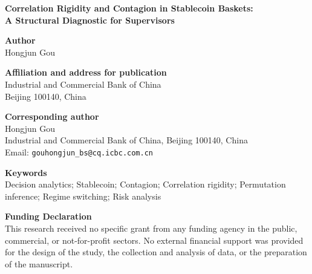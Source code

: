 \documentclass[11pt]{article}
\begin{document}
\begin{center}
{\Large\bfseries Correlation Rigidity and Contagion in Stablecoin Baskets:\\[2pt]
A Structural Diagnostic for Supervisors}
\end{center}

\bigskip
\noindent\textbf{Author}\\
Hongjun Gou

\bigskip
\noindent\textbf{Affiliation and address for publication}\\
Industrial and Commercial Bank of China\\
Beijing 100140, China

\bigskip
\noindent\textbf{Corresponding author}\\
Hongjun Gou\\
Industrial and Commercial Bank of China, Beijing 100140, China\\
Email: \texttt{gouhongjun\_bs@cq.icbc.com.cn}

\bigskip
\noindent\textbf{Keywords}\\
Decision analytics; Stablecoin; Contagion; Correlation rigidity; Permutation inference; Regime switching; Risk analysis

\bigskip
\noindent\textbf{Funding Declaration}\\
This research received no specific grant from any funding agency in the public, commercial, or not-for-profit sectors. No external financial support was provided for the design of the study, the collection and analysis of data, or the preparation of the manuscript.
\end{document}
